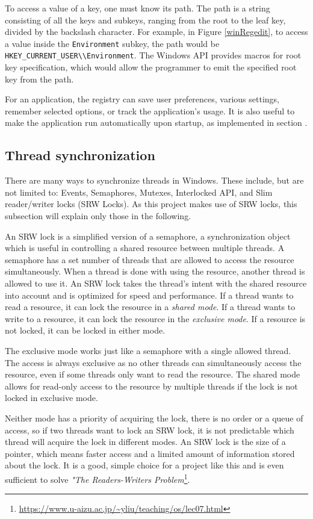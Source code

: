 To access a value of a key, one must know its path. The path is a string consisting of all the keys and subkeys, ranging from the root to the leaf key, divided by the backslash character.\cite{WinRegStruct}
For example, in Figure \ref{winRegedit}, to access a value inside the \lstinline{Environment} subkey, the path would be \lstinline{HKEY_CURRENT_USER\\Environment}. The Windows API provides macros for root key specification, which would allow the programmer to emit the specified root key from the path.

For an application, the registry can save user preferences, various settings, remember selected options, or track the application's usage. It is also useful to make the application run automatically upon startup, as implemented in section .

\subsection{Thread synchronization}
There are many ways to synchronize threads in Windows. These include, but are not limited to: Events, Semaphores, Mutexes, Interlocked API, and Slim reader/writer locks (SRW Locks). As this project makes use of SRW locks, this subsection will explain only those in the following.\cite{WinSyncFuncs}

An SRW lock is a simplified version of a semaphore, a synchronization object which is useful in controlling a shared resource between multiple threads. A semaphore has a set number of threads that are allowed to access the resource simultaneously. When a thread is done with using the resource, another thread is allowed to use it.\cite{WinSemaphores} An SRW lock takes the thread's intent with the shared resource into account and is optimized for speed and performance. If a thread wants to read a resource, it can lock the resource in a \textit{shared mode}. If a thread wants to write to a resource, it can lock the resource in the \textit{exclusive mode}. If a resource is not locked, it can be locked in either mode. 

The exclusive mode works just like a semaphore with a single allowed thread. The access is always exclusive as no other threads can simultaneously access the resource, even if some threads only want to read the resource.
The shared mode allows for read-only access to the resource by multiple threads if the lock is not locked in exclusive mode.

Neither mode has a priority of acquiring the lock, there is no order or a queue of access, so if two threads want to lock an SRW lock, it is not predictable which thread will acquire the lock in different modes. An SRW lock is the size of a pointer, which means faster access and a limited amount of information stored about the lock. It is a good, simple choice for a project like this and is even sufficient to solve \textit{"The Readers-Writers Problem}\footnote{\url{https://www.u-aizu.ac.jp/~yliu/teaching/os/lec07.html}}.
\cite{WinSRW}

